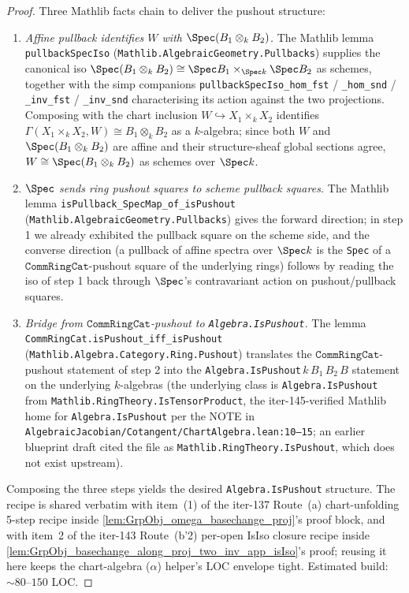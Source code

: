 \begin{proof}

\leanok
  Three Mathlib facts chain to deliver the pushout structure:
  \begin{enumerate}
    \item \emph{Affine pullback identifies \(W\) with \(\Spec(B_1 \otimes_k B_2)\).} The Mathlib lemma \texttt{pullbackSpecIso} (\texttt{Mathlib.AlgebraicGeometry.Pullbacks}) supplies the canonical iso \(\Spec(B_1 \otimes_k B_2) \cong \Spec B_1 \times_{\Spec k} \Spec B_2\) as schemes, together with the simp companions \texttt{pullbackSpecIso\_hom\_fst} / \texttt{\_hom\_snd} / \texttt{\_inv\_fst} / \texttt{\_inv\_snd} characterising its action against the two projections. Composing with the chart inclusion \(W \hookrightarrow X_1 \times_k X_2\) identifies \(\Gamma(X_1 \times_k X_2, W) \cong B_1 \otimes_k B_2\) as a \(k\)-algebra; since both \(W\) and \(\Spec(B_1 \otimes_k B_2)\) are affine and their structure-sheaf global sections agree, \(W \cong \Spec(B_1 \otimes_k B_2)\) as schemes over \(\Spec k\).
    \item \emph{\(\Spec\) sends ring pushout squares to scheme pullback squares.} The Mathlib lemma \texttt{isPullback\_SpecMap\_of\_isPushout} (\texttt{Mathlib.AlgebraicGeometry.Pullbacks}) gives the forward direction; in step 1 we already exhibited the pullback square on the scheme side, and the converse direction (a pullback of affine spectra over \(\Spec k\) is the \texttt{Spec} of a \(\mathtt{CommRingCat}\)-pushout square of the underlying rings) follows by reading the iso of step 1 back through \(\Spec\)'s contravariant action on pushout/pullback squares.
    \item \emph{Bridge from \(\mathtt{CommRingCat}\)-pushout to \texttt{Algebra.IsPushout}.} The lemma \texttt{CommRingCat.isPushout\_iff\_isPushout} (\texttt{Mathlib.Algebra.Category.Ring.Pushout}) translates the \(\mathtt{CommRingCat}\)-pushout statement of step 2 into the \texttt{Algebra.IsPushout}\,\(k\)\,\(B_1\)\,\(B_2\)\,\(B\) statement on the underlying \(k\)-algebras (the underlying class is \texttt{Algebra.IsPushout} from \texttt{Mathlib.RingTheory.IsTensorProduct}, the iter-145-verified Mathlib home for \texttt{Algebra.IsPushout} per the NOTE in \texttt{AlgebraicJacobian/Cotangent/ChartAlgebra.lean:10--15}; an earlier blueprint draft cited the file as \texttt{Mathlib.RingTheory.IsPushout}, which does not exist upstream).
  \end{enumerate}
  Composing the three steps yields the desired \texttt{Algebra.IsPushout} structure. The recipe is shared verbatim with item~(1) of the iter-137 Route~(a) chart-unfolding 5-step recipe inside \cref{lem:GrpObj_omega_basechange_proj}'s proof block, and with item~2 of the iter-143 Route~(b'2) per-open IsIso closure recipe inside \cref{lem:GrpObj_basechange_along_proj_two_inv_app_isIso}'s proof; reusing it here keeps the chart-algebra (\(\alpha\)) helper's LOC envelope tight. Estimated build: \(\sim 80\)--\(150\) LOC.


\end{proof}

